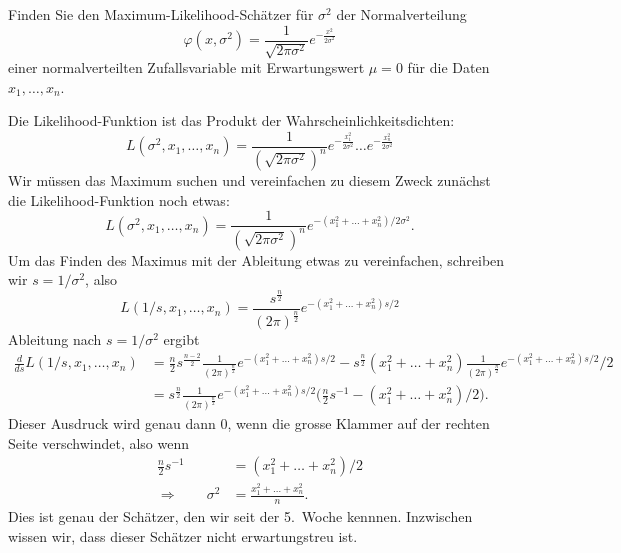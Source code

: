 Finden Sie den Maximum-Likelihood-Schätzer für $\sigma^2$ der Normalverteilung
\[
\varphi(x,\sigma^2)
= 
\frac1{\sqrt{2\pi \sigma^2}} e^{-\frac{x^2}{2\sigma^2}}
\]
einer normalverteilten Zufallsvariable mit Erwartungswert $\mu=0$ für die
Daten $x_1,\dots,x_n$.

\begin{loesung}
Die Likelihood-Funktion ist das Produkt der Wahrscheinlichkeitsdichten:
\[
L(\sigma^2,x_1,\dots,x_n)
=
\frac1{(\sqrt{2\pi \sigma^2})^n}
e^{-\frac{x_1^2}{2\sigma^2}}
\dots
e^{-\frac{x_n^2}{2\sigma^2}}
\]
Wir müssen das Maximum suchen und vereinfachen zu diesem Zweck zunächst
die Likelihood-Funktion noch etwas:
\[
L(\sigma^2,x_1,\dots,x_n)
=
\frac1{(\sqrt{2\pi \sigma^2})^n}
e^{-(x_1^2+\dots+x_n^2)/2\sigma^2}.
\]
Um das Finden des Maximus mit der Ableitung etwas zu vereinfachen,
schreiben wir $s=1/\sigma^2$, also
\[
L(1/s,x_1,\dots,x_n)
=
\frac{s^{\frac{n}2}}{(2\pi)^{\frac{n}2}}
e^{-(x_1^2+\dots+x_n^2)s/2}
\]
Ableitung nach $s=1/\sigma^2$ ergibt
\begin{align*}
\frac{d}{ds}
L(1/s,x_1,\dots,x_n)
&=
\frac{n}2s^{\frac{n-2}2}
\frac1{(2\pi)^{\frac{n}2}}
e^{-(x_1^2+\dots+x_n^2)s/2}
-
s^{\frac{n}2}
(x_1^2+\dots+x_n^2)
\frac1{(2\pi)^{\frac{n}2}}
e^{-(x_1^2+\dots+x_n^2)s/2}/2
\\
&=
s^{\frac{n}2}
\frac1{(2\pi)^{\frac{n}2}}
e^{-(x_1^2+\dots+x_n^2)s/2}
\biggl(
\frac{n}2
s^{-1}
-
(x_1^2+\dots+x_n^2)/2
\biggr).
\end{align*}
Dieser Ausdruck wird genau dann $0$, wenn die grosse Klammer auf der
rechten Seite verschwindet, also wenn
\begin{align*}
\frac{n}2
s^{-1}
&=
(x_1^2+\dots+x_n^2)/2
\\
\Rightarrow\qquad
\sigma^2
&=
\frac{x_1^2+\dots+x_n^2}n.
\end{align*}
Dies ist genau der Schätzer, den wir seit der 5.~Woche kennnen.
Inzwischen wissen wir, dass dieser Schätzer nicht erwartungstreu ist.
\end{loesung}



